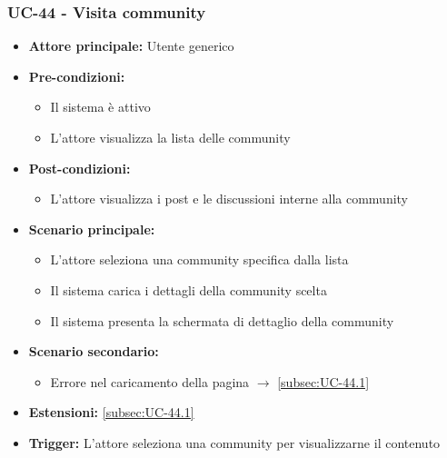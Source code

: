 \documentclass[a4paper,12pt]{article}
\begin{document}
\subsubsection{UC-44 - Visita community} \label{sec:UC-44}
\begin{itemize}
    \item \textbf{Attore principale:} Utente generico
    \item \textbf{Pre-condizioni:}
    \begin{itemize}
        \item Il sistema è attivo
        \item L'attore visualizza la lista delle community
    \end{itemize}
    \item \textbf{Post-condizioni:}
    \begin{itemize}
        \item L'attore visualizza i post e le discussioni interne alla community
    \end{itemize}
    \item \textbf{Scenario principale:} 
    \begin{itemize}
        \item L'attore seleziona una community specifica dalla lista
        \item Il sistema carica i dettagli della community scelta
        \item Il sistema presenta la schermata di dettaglio della community
    \end{itemize}
    \item \textbf{Scenario secondario:} 
    \begin{itemize}
         \item Errore nel caricamento della pagina $\rightarrow$ \ref{subsec:UC-44.1}
    \end{itemize}
    \item \textbf{Estensioni:} \ref{subsec:UC-44.1}
    \item \textbf{Trigger:} L'attore seleziona una community per visualizzarne il contenuto
\end{itemize}
\end{document}
